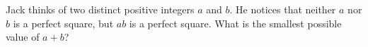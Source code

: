Jack thinks of two distinct positive integers $a$ and $b$. He notices that neither $a$ nor $b$ is a perfect square, but $ab$ is a perfect square. What is the smallest possible value of $a + b$?
